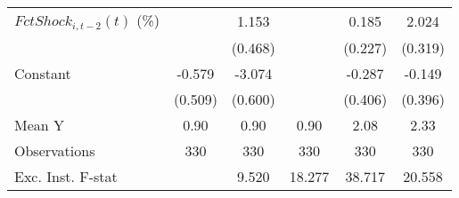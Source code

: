 {\begin{tabular}{l*{5}{c}}
\addlinespace
$ FctShock_{i,t-2}(t)$ (\%)&                     &       1.153\sym{**} &                     &       0.185         &       2.024\sym{***}\\
                    &                     &     (0.468)         &                     &     (0.227)         &     (0.319)         \\
\addlinespace
Constant            &      -0.579         &      -3.074\sym{***}&                     &      -0.287         &      -0.149         \\
                    &     (0.509)         &     (0.600)         &                     &     (0.406)         &     (0.396)         \\
\midrule
Mean Y              &        0.90         &        0.90         &        0.90         &        2.08         &        2.33         \\
Observations        &         330         &         330         &         330         &         330         &         330         \\
Exc. Inst. F-stat   &                     &       9.520         &      18.277         &      38.717         &      20.558         \\
\bottomrule
\end{tabular}
}
